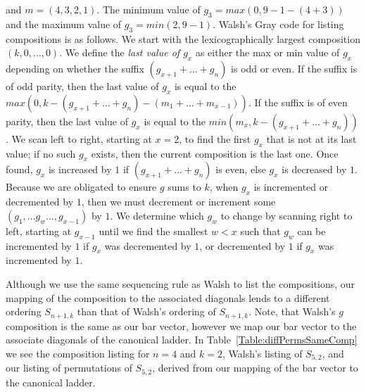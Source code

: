  and $m=(4,3,2,1)$. The minimum value of $g_{3}=max(0, 9 - 1 - (4+3))$ and the maximum value of $g_{3}=min(2, 9-1)$. 
 Walsh's Gray code for listing compositions is as follows. We start with the lexicographically largest composition $(k,0, \dots ,0)$. We define the 
 \emph{last value of $g_{x}$} as either the max or min value of $g_{x}$ 
 depending on whether the suffix $(g_{x+1}+ \dots +g_{n})$ is odd or even. If the suffix is of odd parity, then the last value of $g_{x}$ is 
 equal to the $max(0, k-(g_{x+1} + \dots + g_{n})-(m_{1} + \dots + m_{x-1}))$. If the suffix is of even parity, then the last value of 
 $g_{x}$ is equal to the $min(m_{x}, k-(g_{x+1} + \dots + g_{n}))$. We 
 scan left to right, starting at $x=2$, to find the first $g_{x}$ that is not at its last value; if no such $g_{x}$ exists, then the current composition 
 is the last one. Once found, $g_{x}$ is increased by $1$ if $(g_{x+1} + \dots + g_{n})$ is even, else $g_{x}$ is decreased by $1$. Because we are 
 obligated to ensure $g$ sums to $k$, when $g_{x}$ is incremented or decremented by $1$, then we must decrement or increment some $(g_{1}, \dots g_{w} \dots, g_{x-1})$ 
 by $1$. We determine which $g_{w}$ to change by scanning right to left, starting at $g_{x-1}$ until we find the smallest $w<x$ such that 
 $g_{w}$ can be incremented by $1$ if $g_{x}$ was decremented by $1$, or decremented by $1$ if $g_{x}$ was incremented by $1$.\par 
 Although we use the same sequencing rule as Walsh to list the compositions, our mapping of the composition 
 to the associated diagonals lends to a different ordering $S_{n+1,k}$ than that of Walsh's ordering of $S_{n+1,k}$. Note, 
 that Walsh's $g$ composition is the same as our bar vector, however we map our bar vector to the associate diagonals of the 
 canonical ladder. 
 In Table~\ref{Table:diffPermsSameComp} we see the composition listing for $n=4$ and $k=2$, 
 Walsh's listing of $S_{5,2}$, and our listing of permutations of $S_{5,2}$, derived from our mapping of the bar vector to the canonical ladder. 
